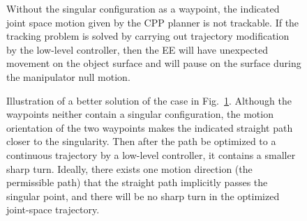 \documentclass[Afour,sageh,times]{sagej}
\begin{document}
\begin{figure}[t]
\centering
{}
\caption{Without the singular configuration as a waypoint, the indicated joint space motion given by the CPP planner is not trackable. If the tracking problem is solved by carrying out trajectory modification by the low-level controller, then the EE will have unexpected movement on the object surface and will pause on the surface during the manipulator null motion. 
}\label{fig:indicated}
\end{figure}

\begin{figure}[t]
\centering
{}
\caption{Illustration of a better solution of the case in Fig.~\ref{fig:indicated}. Although the waypoints neither contain a singular configuration, the motion orientation of the two waypoints makes the indicated straight path closer to the singularity. 
Then after the path be optimized to a continuous trajectory by a low-level controller, it contains a smaller sharp turn. Ideally, there exists one motion direction (the permissible path) that the straight path implicitly passes the singular point, and there will be no sharp turn in the optimized joint-space trajectory. 
}\label{fig:better}
\end{figure}
\end{document}
